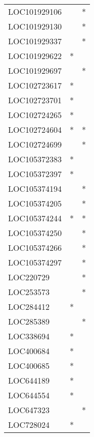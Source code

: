 \begin{longtable}{lcc}
LOC101929106     &                &          * \\
LOC101929130     &                &          * \\
LOC101929337     &                &          * \\
LOC101929622     &              * &            \\
LOC101929697     &                &          * \\
LOC102723617     &              * &            \\
LOC102723701     &              * &            \\
LOC102724265     &              * &            \\
LOC102724604     &              * &          * \\
LOC102724699     &                &          * \\
LOC105372383     &              * &            \\
LOC105372397     &              * &            \\
LOC105374194     &                &          * \\
LOC105374205     &                &          * \\
LOC105374244     &              * &          * \\
LOC105374250     &                &          * \\
LOC105374266     &                &          * \\
LOC105374297     &                &          * \\
LOC220729        &                &          * \\
LOC253573        &                &          * \\
LOC284412        &              * &            \\
LOC285389        &                &          * \\
LOC338694        &              * &            \\
LOC400684        &              * &            \\
LOC400685        &              * &            \\
LOC644189        &              * &            \\
LOC644554        &              * &            \\
LOC647323        &                &          * \\
LOC728024        &              * &            \\

\end{longtable}
